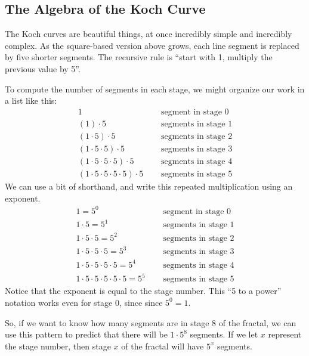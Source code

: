 \subsection{The Algebra of the Koch Curve}

The Koch curves are beautiful things, at once incredibly simple and incredibly complex. As the square-based version above grows, each line segment is replaced by five shorter segments. The recursive rule is ``start with 1, multiply the previous value by 5''.

To compute the number of segments in each stage, we might organize our work in a list like this:\[\begin{aligned}
1 & \quad\text{ segment in stage 0}
\\
(1) \cdot 5 & \quad\text{ segments in stage 1}
\\
(1 \cdot 5) \cdot 5 & \quad\text{ segments in stage 2}
\\
(1 \cdot 5 \cdot 5) \cdot 5 & \quad\text{ segments in stage 3}
\\
(1 \cdot 5 \cdot 5 \cdot 5) \cdot 5 & \quad\text{ segments in stage 4}
\\
(1 \cdot 5 \cdot 5 \cdot 5 \cdot 5) \cdot 5 & \quad\text{ segments in stage 5}
\end{aligned}\]
We can use a bit of shorthand, and write this repeated multiplication using an exponent.
\[\begin{aligned}
1 =5^0& \quad\text{ segment in stage 0}
\\
1 \cdot 5 =5^1& \quad\text{ segments in stage 1}
\\
1 \cdot 5 \cdot 5 =5^2& \quad\text{ segments in stage 2}
\\
1 \cdot 5 \cdot 5 \cdot 5 =5^3& \quad\text{ segments in stage 3}
\\
1 \cdot 5 \cdot 5 \cdot 5 \cdot 5 =5^4& \quad\text{ segments in stage 4}
\\
1 \cdot 5 \cdot 5 \cdot 5 \cdot 5 \cdot 5 =5^5& \quad\text{ segments in stage 5}
\end{aligned}\]
Notice that the exponent is equal to the stage number. This ``5 to a power'' notation works even for stage 0, since since $5^{0} = 1$.

So, if we want to know how many segments are in stage 8 of the fractal, we can use this pattern to predict that there will be $1\cdot 5^8$ segments. If we let $x$ represent the stage number, then stage $x$ of the fractal will have $5^x$ segments.

